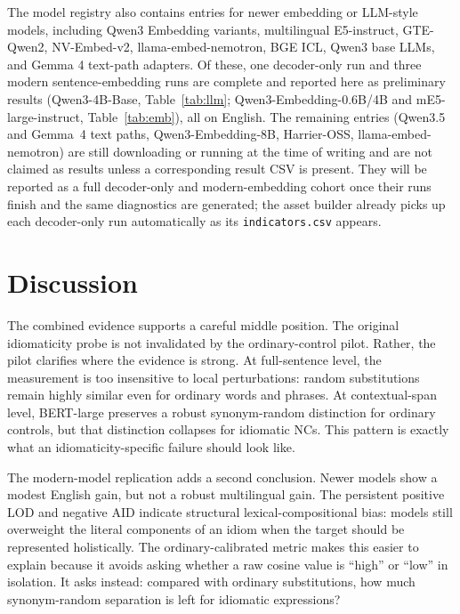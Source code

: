 \documentclass[11pt]{article}
\begin{document}
The model registry also contains entries for newer embedding or LLM-style models, including Qwen3
Embedding variants, multilingual E5-instruct, GTE-Qwen2, NV-Embed-v2, llama-embed-nemotron, BGE
ICL, Qwen3 base LLMs, and Gemma 4 text-path adapters. Of these, one decoder-only run and three
modern sentence-embedding runs are complete and reported here as preliminary results
(Qwen3-4B-Base, Table~\ref{tab:llm}; Qwen3-Embedding-0.6B/4B and mE5-large-instruct,
Table~\ref{tab:emb}), all on English. The remaining entries (Qwen3.5 and Gemma~4 text paths,
Qwen3-Embedding-8B, Harrier-OSS, llama-embed-nemotron) are still downloading or running at the time
of writing and are not claimed as results unless a corresponding result CSV is present. They will be reported as a full decoder-only and
modern-embedding cohort once their runs finish and the same diagnostics are generated; the asset
builder already picks up each decoder-only run automatically as its \texttt{indicators.csv} appears.

\section{Discussion}

The combined evidence supports a careful middle position. The original idiomaticity probe is not
invalidated by the ordinary-control pilot. Rather, the pilot clarifies where the evidence is strong.
At full-sentence level, the measurement is too insensitive to local perturbations: random
substitutions remain highly similar even for ordinary words and phrases. At contextual-span level,
BERT-large preserves a robust synonym-random distinction for ordinary controls, but that distinction
collapses for idiomatic NCs. This pattern is exactly what an idiomaticity-specific failure should
look like.

The modern-model replication adds a second conclusion. Newer models show a modest English gain, but
not a robust multilingual gain. The persistent positive LOD and negative AID indicate structural
lexical-compositional bias: models still overweight the literal components of an idiom when the
target should be represented holistically. The ordinary-calibrated metric makes this easier to
explain because it avoids asking whether a raw cosine value is ``high'' or ``low'' in isolation. It
asks instead: compared with ordinary substitutions, how much synonym-random separation is left for
idiomatic expressions?
\end{document}
